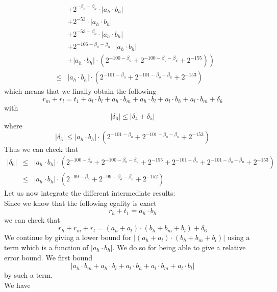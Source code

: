 \documentclass[a4paper,10pt,twoside]{article}
\newenvironment{proof}[1][Proof]{\begin{trivlist}
\item[\hskip \labelsep {\bfseries #1}]}{\end{trivlist}}
\newcommand{\hi}{\ensuremath{\mathit{h}}}
\newcommand{\mi}{\ensuremath{\mathit{m}}}
\newcommand{\lo}{\ensuremath{\mathit{l}}}
\begin{document}
\begin{proof}
\begin{eqnarray*}
& & + 2^{-\beta_o-\beta_u} \cdot \left \vert a_\hi \cdot b_\hi \right \vert \\
& & + 2^{-53} \cdot \left \vert a_\hi \cdot b_\hi \right \vert \\
& & + 2^{-53-\beta_o} \cdot \left \vert a_\hi \cdot b_\hi \right \vert \\
& & + 2^{-106-\beta_o-\beta_u} \cdot \left \vert a_\hi \cdot b_\hi \right \vert \\
& & \left. + \left \vert a_\hi \cdot b_\hi \right \vert \cdot \left( 2^{-100-\beta_o} + 2^{-100-\beta_o-\beta_u} + 2^{-155} \right) \right) \\
& \leq & \left \vert a_\hi \cdot b_\hi \right \vert \cdot \left( 2^{-101-\beta_o} + 2^{-101-\beta_o-\beta_u} + 2^{-153} \right)
\end{eqnarray*}
which means that we finally obtain the following
$$r_\mi + r_\lo = t_1 + a_\lo \cdot b_\lo + a_\hi \cdot b_\mi + a_\hi \cdot b_\lo + a_\lo \cdot b_\hi + a_\lo \cdot b_\mi + \delta_6$$
with
$$\left \vert \delta_6 \right \vert \leq \left \vert \delta_4 + \delta_5 \right \vert$$
where
$$\left \vert \delta_5 \right \vert \leq 
\left \vert a_\hi \cdot b_\hi \right \vert \cdot \left( 2^{-101-\beta_o} + 2^{-101-\beta_o-\beta_u} + 2^{-153} \right)$$
Thus we can check that
\begin{eqnarray*}
\left \vert \delta_6 \right \vert & \leq & 
\left \vert a_\hi \cdot b_\hi \right \vert \cdot \left( 2^{-100-\beta_o} + 2^{-100-\beta_o-\beta_u} + 2^{-155} +
2^{-101-\beta_o} + 2^{-101-\beta_o-\beta_u} + 2^{-153} \right) \\
& \leq & \left \vert a_\hi \cdot b_\hi \right \vert \cdot \left( 2^{-99-\beta_o} + 2^{-99-\beta_o-\beta_u} + 2^{-152} \right)
\end{eqnarray*}
Let us now integrate the different intermediate results:\\
Since we know that the following egality is exact
$$r_\hi + t_1 = a_\hi \cdot b_\hi$$
we can check that
$$r_\hi + r_\mi + r_\lo = \left( a_\hi + a_\lo \right) \cdot \left( b_\hi + b_\mi + b_\lo \right) + \delta_6$$
We continue by giving a lower bound for 
$\left \vert \left( a_\hi + a_\lo \right) \cdot \left( b_\hi + b_\mi + b_\lo \right) \right \vert$
using a term which is a function of $\left \vert a_\hi \cdot b_\hi \right \vert$. We do so for being able to give
a relative error bound.
We first bound $$\left \vert a_\hi \cdot b_\mi + a_\hi \cdot b_\lo + a_\lo \cdot b_\hi + a_\lo \cdot b_\mi + a_\lo \cdot b_\lo \right \vert$$
by such a term.\\
We have

\end{proof}
\end{document}
